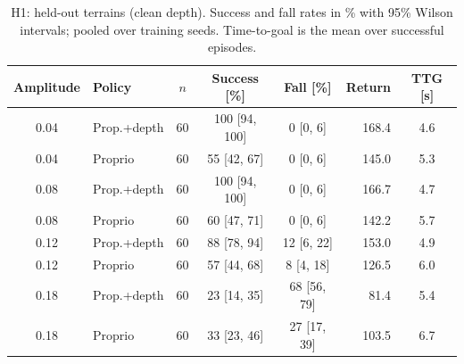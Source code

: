 \begin{table}[t]
\centering\caption{H1: held-out terrains (clean depth). Success and fall rates in \% with 95\% Wilson intervals; pooled over training seeds. Time-to-goal is the mean over successful episodes.}\label{tab:h1}
\small\begin{tabular}{clcccrc}\toprule
Amplitude & Policy & $n$ & Success [\%] & Fall [\%] & Return & TTG [s]\\\midrule
0.04 & Prop.+depth & 60 & 100 [94, 100] & 0 [0, 6] & 168.4 & 4.6 \\
0.04 & Proprio & 60 & 55 [42, 67] & 0 [0, 6] & 145.0 & 5.3 \\
0.08 & Prop.+depth & 60 & 100 [94, 100] & 0 [0, 6] & 166.7 & 4.7 \\
0.08 & Proprio & 60 & 60 [47, 71] & 0 [0, 6] & 142.2 & 5.7 \\
0.12 & Prop.+depth & 60 & 88 [78, 94] & 12 [6, 22] & 153.0 & 4.9 \\
0.12 & Proprio & 60 & 57 [44, 68] & 8 [4, 18] & 126.5 & 6.0 \\
0.18 & Prop.+depth & 60 & 23 [14, 35] & 68 [56, 79] & 81.4 & 5.4 \\
0.18 & Proprio & 60 & 33 [23, 46] & 27 [17, 39] & 103.5 & 6.7 \\
\bottomrule\end{tabular}\end{table}
